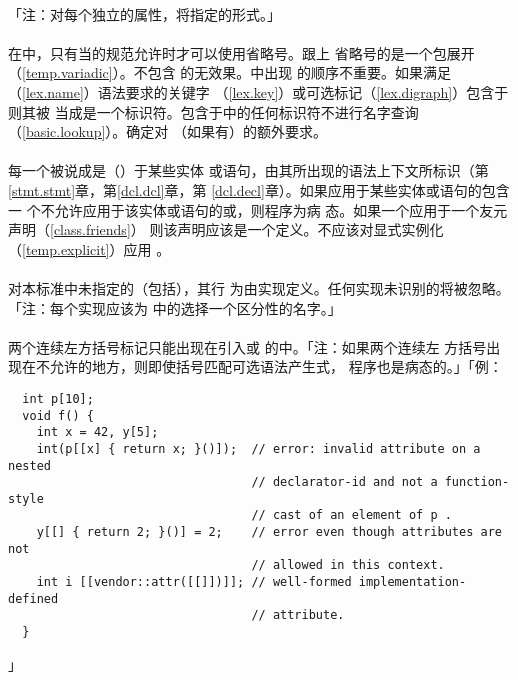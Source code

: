 \paragraph{}
「注：对每个独立的属性，将指定的形式。」

\paragraph{}
在中，只有当的规范允许时才可以使用省略号。跟上
省略号的是一个包展开（\ref{temp.variadic}）。不包含
的无效果。中出现
的顺序不重要。如果满足（\ref{lex.name}）语法要求的关键字
（\ref{lex.key}）或可选标记（\ref{lex.digraph}）包含于则其被
当成是一个标识符。包含于中的任何标识符不进行名字查询
（\ref{basic.lookup}）。确定对
（如果有）的额外要求。

\paragraph{}
每一个被说成是（）于某些实体
或语句，由其所出现的语法上下文所标识（第\ref{stmt.stmt}章，第\ref{dcl.dcl}章，第
\ref{dcl.decl}章）。如果应用于某些实体或语句的包含一
个不允许应用于该实体或语句的或，则程序为病
态。如果一个应用于一个友元声明（\ref{class.friends}）
则该声明应该是一个定义。不应该对显式实例化（\ref{temp.explicit}）应用
。

\paragraph{}
对本标准中未指定的（包括），其行
为由实现定义。任何实现未识别的将被忽略。「注：每个实现应该为
中的选择一个区分性的名字。」

\paragraph{}
两个连续左方括号标记只能出现在引入或
的中。「注：如果两个连续左
方括号出现在不允许的地方，则即使括号匹配可选语法产生式，
程序也是病态的。」「例：
\begin{lstlisting}
  int p[10];
  void f() {
    int x = 42, y[5];
    int(p[[x] { return x; }()]);  // error: invalid attribute on a nested
                                  // declarator-id and not a function-style
                                  // cast of an element of p .
    y[[] { return 2; }()] = 2;    // error even though attributes are not
                                  // allowed in this context.
    int i [[vendor::attr([[]])]]; // well-formed implementation-defined
                                  // attribute.
  }
\end{lstlisting}」

